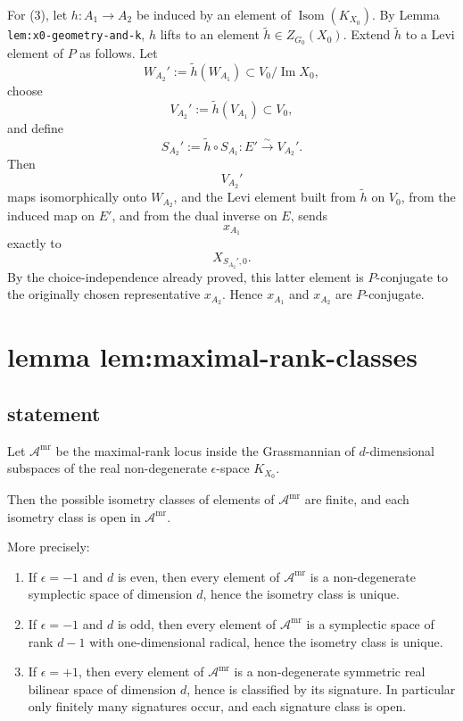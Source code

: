 \documentclass[
  11pt,
]{article}
\begin{document}
For (3), let \(h:A_1\to A_2\) be induced by an element of
\(\operatorname{Isom}(K_{X_0})\). By Lemma
\texttt{lem:x0-geometry-and-k}, \(h\) lifts to an element
\(\widetilde h\in Z_{G_0}(X_0)\). Extend \(\widetilde h\) to a Levi
element of \(P\) as follows. Let \[
W_{A_2}':=\widetilde h(W_{A_1})\subset V_0/\operatorname{Im} X_0,
\] choose \[
V_{A_2}':=\widetilde h(V_{A_1})\subset V_0,
\] and define \[
S_{A_2}':=\widetilde h\circ S_{A_1}:E'\xrightarrow{\sim} V_{A_2}'.
\] Then \[
V_{A_2}'
\] maps isomorphically onto \(W_{A_2}\), and the Levi element built from
\(\widetilde h\) on \(V_0\), from the induced map on \(E'\), and from
the dual inverse on \(E\), sends \[
x_{A_1}
\] exactly to \[
X_{S_{A_2}',0}.
\] By the choice-independence already proved, this latter element is
\(P\)-conjugate to the originally chosen representative \(x_{A_2}\).
Hence \(x_{A_1}\) and \(x_{A_2}\) are \(P\)-conjugate.

\section{lemma
lem:maximal-rank-classes}\label{lemma-lemmaximal-rank-classes}

\subsection{statement}\label{statement-4}

Let \(\mathscr A^{\mathrm{mr}}\) be the maximal-rank locus inside the
Grassmannian of \(d\)-dimensional subspaces of the real non-degenerate
\(\epsilon\)-space \(K_{X_0}\).

Then the possible isometry classes of elements of
\(\mathscr A^{\mathrm{mr}}\) are finite, and each isometry class is open
in \(\mathscr A^{\mathrm{mr}}\).

More precisely:

\begin{enumerate}
\def\labelenumi{\arabic{enumi}.}
\item
  If \(\epsilon=-1\) and \(d\) is even, then every element of
  \(\mathscr A^{\mathrm{mr}}\) is a non-degenerate symplectic space of
  dimension \(d\), hence the isometry class is unique.
\item
  If \(\epsilon=-1\) and \(d\) is odd, then every element of
  \(\mathscr A^{\mathrm{mr}}\) is a symplectic space of rank \(d-1\)
  with one-dimensional radical, hence the isometry class is unique.
\item
  If \(\epsilon=+1\), then every element of \(\mathscr A^{\mathrm{mr}}\)
  is a non-degenerate symmetric real bilinear space of dimension \(d\),
  hence is classified by its signature. In particular only finitely many
  signatures occur, and each signature class is open.
\end{enumerate}
\end{document}
